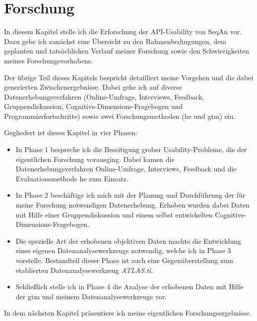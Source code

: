\glsresetall
\chapter{Forschung}
\label{sec:forschung}

In diesem Kapitel stelle ich die Erforschung der API-Usability von SeqAn vor. Dazu gebe ich zunächst eine Übersicht zu den Rahmenbedingungen, dem geplanten und tatsächlichen Verlauf meiner Forschung sowie den Schwierigkeiten meines Forschungsvorhabens.

Der übrige Teil dieses Kapitels bespricht detailliert meine Vorgehen und die dabei generierten Zwischenergebnisse. Dabei gehe ich auf diverse Datenerhebungsverfahren (Online-Umfrage, Interviews, Feedback, Gruppendiskussion, Cognitive-Dimensions-Fragebogen und Programmierfortschritte) sowie zwei Forschungsmethoden (\acrlong{he} und \acrlong{gtm}) ein.

Gegliedert ist dieses Kapitel in vier Phasen:
\begin{itemize}
  \item In Phase 1 bespreche ich die Beseitigung grober Usability-Probleme, die der eigentlichen Forschung vorausging. Dabei kamen die Datenerhebungsverfahren Online-Umfrage, Interviews, Feedback und die Evaluationsmethode \gls{he} zum Einsatz.
  \item In Phase 2 beschäftige ich mich mit der Planung und Durchführung der für meine Forschung notwendigen Datenerhebung. Erhoben wurden dabei Daten mit Hilfe einer Gruppendiskussion und einem selbst entwickelten Cognitive-Dimensions-Fragebogen.
  \item Die spezielle Art der erhobenen objektiven Daten machte die Entwicklung eines eigenen Datenanalysewerkzeugs notwendig, welche ich in Phase 3 vorstelle. Bestandteil dieser Phase ist auch eine Gegenüberstellung zum etablierten Datenanalysewerkzeug \textit{ATLAS.ti}.
  \item Schließlich stelle ich in Phase 4 die Analyse der erhobenen Daten mit Hilfe der \gls{gtm} und meinem Datenanalysewerkzeugs vor. 
\end{itemize}

In dem nächsten Kapitel präsentiere ich meine eigentlichen Forschungsergebnisse.











